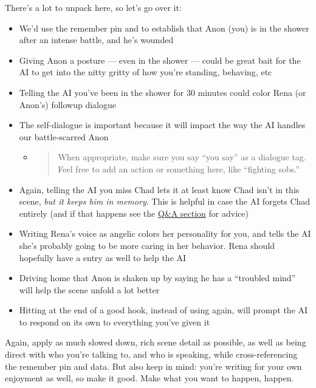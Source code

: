 \documentclass[Avsfag-main.tex]{subfiles}
\begin{document}
There's a lot to unpack here, so let's go over it:

\begin{itemize}
\item
  We'd use the remember pin and \story to establish that Anon (you) is
  in the shower after an intense battle, and he's wounded
\item
  Giving Anon a posture --- even in the shower --- could be great bait
  for the AI to get into the nitty gritty of how you're standing,
  behaving, etc
\item
  Telling the AI you've been in the shower for 30 minutes could color
  Rena (or Anon's) followup dialogue
\item
  The self-dialogue is important because it will impact the way the AI
  handles our battle-scarred Anon

  \begin{itemize}
  \item
    \begin{quote}
    When appropriate, make sure you say ``you say'' as a dialogue tag.
    Feel free to add an action or something here, like ``fighting
    sobs.''
    \end{quote}
  \end{itemize}
\item
  Again, telling the AI you miss Chad lets it at least know Chad isn't
  in this scene, \emph{but it keeps him in memory}. This is helpful in
  case the AI forgets Chad entirely (and if that happens see the
  \hyperref[ch:qa]{Q\&A section} for advice)
\item
  Writing Rena's voice as angelic colors her personality for you, and
  tells the AI she's probably going to be more caring in her behavior.
  Rena should hopefully have a \wi entry as well to help the AI
\item
  Driving home that Anon is shaken up by saying he has a ``troubled
  mind'' will help the scene unfold a lot better
\item
  Hitting \keys{\return} at the end of a good \story hook, instead of using
  \story again, will prompt the AI to respond on its own to everything
  you've given it
\end{itemize}

Again, apply as much slowed down, rich scene detail as possible, as well as being direct with who you're talking to, and who is speaking, while cross-referencing the remember pin and \wi data.
But also keep in mind: you're writing for your own enjoyment as well, so make it good.
Make what you want to happen, happen.
\end{document}

